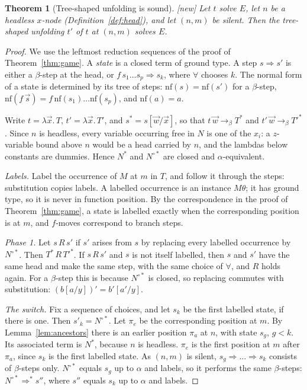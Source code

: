 \documentclass[11pt]{article}
\newcommand{\New}{\textsf{[new]}}
\theoremstyle{plain}
\newtheorem{theorem}{Theorem}[section]
\theoremstyle{definition}
\theoremstyle{remark}
\begin{document}
\begin{theorem}[Tree-shaped unfolding is sound]\label{thm:treeunf}
\New{} Let $t$ solve $E$, let $n$ be a headless $x$-node
(Definition~\ref{def:head}), and let $(n,m)$ be silent.  Then the
tree-shaped unfolding $t'$ of $t$ at $(n,m)$ solves $E$.
\end{theorem}
\begin{proof}
We use the leftmost reduction sequences of the proof of
Theorem~\ref{thm:game}.  A \emph{state} is a closed term of ground
type.  A step $s\Rightarrow s'$ is either a $\beta$-step at the head, or
$f\,s_1\dots s_p\Rightarrow s_k$, where $\forall$ chooses $k$.  The
normal form of a state is determined by its tree of steps:
$\mathrm{nf}(s)=\mathrm{nf}(s')$ for a $\beta$-step,
$\mathrm{nf}(f\,\vec s)=f\,\mathrm{nf}(s_1)\dots\mathrm{nf}(s_p)$, and
$\mathrm{nf}(a)=a$.

Write $t=\lambda\vec x.\,T$, $t'=\lambda\vec x.\,T'$, and
$s^*=s[\vec w/\vec x]$, so that $t\,\vec w\to_\beta T^*$ and
$t'\,\vec w\to_\beta T'^*$.  Since $n$ is headless, every variable
occurring free in $N$ is one of the $x_i$: a $z$-variable bound above
$n$ would be a head carried by $n$, and the lambdas below constants are
dummies.  Hence $N^*$ and $N^{\circ*}$ are closed and $\alpha$-equivalent.

\emph{Labels.}  Label the occurrence of $M$ at $m$ in $T$, and follow it
through the steps: substitution copies labels.  A labelled occurrence
is an instance $M\theta$; it has ground type, so it is never in function
position.  By the correspondence in the proof of
Theorem~\ref{thm:game}, a state is labelled exactly when the
corresponding position is at $m$, and $f$-moves correspond to branch
steps.

\emph{Phase 1.}  Let $s\,R\,s'$ if $s'$ arises from $s$ by replacing
every labelled occurrence by $N^{\circ*}$.  Then $T^*\,R\,T'^*$.  If
$s\,R\,s'$ and $s$ is not itself labelled, then $s$ and $s'$ have the
same head and make the same step, with the same choice of $\forall$, and
$R$ holds again.  For a $\beta$-step this is because $N^{\circ*}$ is
closed, so replacing commutes with substitution:
$(b[a/y])'=b'[a'/y]$.

\emph{The switch.}  Fix a sequence of choices, and let $s_k$ be the
first labelled state, if there is one.  Then $s'_k=N^{\circ*}$.  Let
$\pi_e$ be the corresponding position at $m$.  By
Lemma~\ref{lem:ancestors} there is an earlier position $\pi_a$ at $n$,
with state $s_g$, $g<k$.  Its associated term is $N^*$, because $n$ is
headless.  $\pi_e$ is the first position at $m$ after $\pi_a$, since
$s_k$ is the first labelled state.  As $(n,m)$ is silent,
$s_g\Rightarrow\dots\Rightarrow s_k$ consists of $\beta$-steps only.
$N^{\circ*}$ equals $s_g$ up to $\alpha$ and labels, so it performs the
same $\beta$-steps: $N^{\circ*}\Rightarrow^*s''$, where $s''$ equals
$s_k$ up to $\alpha$ and labels.


\end{proof}
\end{document}
